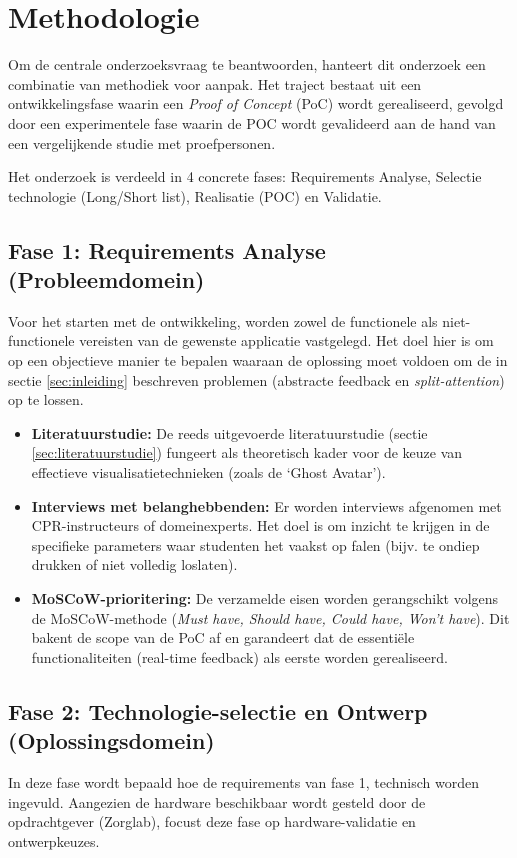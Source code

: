 \section{Methodologie}%
\label{sec:methodologie}
Om de centrale onderzoeksvraag te beantwoorden, hanteert dit onderzoek een combinatie van methodiek voor aanpak. Het traject bestaat uit een ontwikkelingsfase waarin een \textit{Proof of Concept} (PoC) wordt
gerealiseerd, gevolgd door een experimentele fase waarin de POC wordt gevalideerd aan de hand van een vergelijkende studie met proefpersonen.

Het onderzoek is verdeeld in 4 concrete fases: Requirements Analyse, Selectie technologie (Long/Short list), Realisatie (POC) en Validatie.

\subsection{Fase 1: Requirements Analyse (Probleemdomein)}
Voor het starten met de ontwikkeling, worden zowel de functionele als niet-functionele vereisten van de gewenste applicatie vastgelegd. Het doel hier is om op een objectieve manier
te bepalen waaraan de oplossing moet voldoen om de in sectie \ref{sec:inleiding} beschreven problemen (abstracte feedback en \textit{split-attention}) op te lossen.

\begin{itemize}
    \item \textbf{Literatuurstudie:} De reeds uitgevoerde literatuurstudie (sectie \ref{sec:literatuurstudie}) 
    fungeert als theoretisch kader voor de keuze van effectieve visualisatietechnieken (zoals de `Ghost Avatar').
        \item \textbf{Interviews met belanghebbenden:} Er worden interviews afgenomen met CPR-instructeurs of domeinexperts. 
        Het doel is om inzicht te krijgen in de specifieke parameters waar studenten het vaakst op falen (bijv. te ondiep drukken of niet volledig loslaten).
        \item \textbf{MoSCoW-prioritering:} De verzamelde eisen worden gerangschikt volgens de MoSCoW-methode (\textit{Must have, Should have, Could have, Won't have}). 
        Dit bakent de scope van de PoC af en garandeert dat de essentiële functionaliteiten (real-time feedback) als eerste worden gerealiseerd.
\end{itemize}

\subsection{Fase 2: Technologie-selectie en Ontwerp (Oplossingsdomein)}
In deze fase wordt bepaald hoe de requirements van fase 1, technisch worden ingevuld. Aangezien de hardware beschikbaar wordt gesteld door de opdrachtgever (Zorglab), focust deze fase op hardware-validatie
en ontwerpkeuzes.

